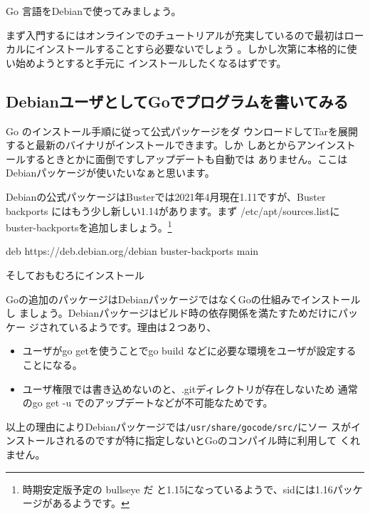 \documentclass[mingoth,a4paper]{jsarticle}
\begin{document}
Go 言語をDebianで使ってみましょう。

まず入門するにはオンラインでのチュートリアルが充実しているので最初はロー
カルにインストールすることすら必要ないでしょう\cite{golang:tourofgo}
\cite{golang:tourofgoja}。しかし次第に本格的に使い始めようとすると手元に
インストールしたくなるはずです。

\subsection{DebianユーザとしてGoでプログラムを書いてみる}

Go のインストール手順\cite{golangorg-install}に従って公式パッケージをダ
ウンロードしてTarを展開すると最新のバイナリがインストールできます。しか
しあとからアンインストールするときとかに面倒ですしアップデートも自動では
ありません。ここはDebianパッケージが使いたいなぁと思います。

Debianの公式パッケージはBusterでは2021年4月現在1.11ですが、Buster
backports にはもう少し新しい1.14があります。まず /etc/apt/sources.listに
buster-backportsを追加しましょう。\footnote{時期安定版予定の bullseye だ
と1.15になっているようで、sidには1.16パッケージがあるようです。}

\begin{commandline}
deb https://deb.debian.org/debian buster-backports main
\end{commandline}

そしておもむろにインストール


Goの追加のパッケージはDebianパッケージではなくGoの仕組みでインストールし
ましょう。Debianパッケージはビルド時の依存関係を満たすためだけにパッケー
ジされているようです。理由は２つあり、

\begin{itemize}
 \item ユーザがgo getを使うことでgo build などに必要な環境をユーザが設定することになる。
 \item ユーザ権限では書き込めないのと、.gitディレクトリが存在しないため
       通常のgo get -u でのアップデートなどが不可能なためです。
\end{itemize}

以上の理由によりDebianパッケージでは\texttt{/usr/share/gocode/src/}にソー
スがインストールされるのですが特に指定しないとGoのコンパイル時に利用して
くれません。
\end{document}
